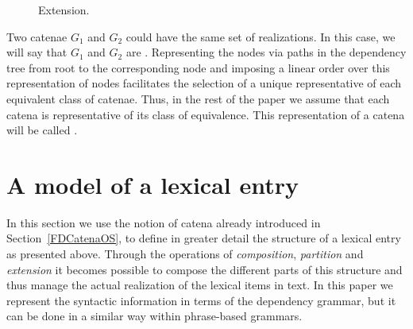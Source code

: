 \documentclass[output=paper,colorlinks,citecolor=brown]{langscibook}
\begin{document}
\begin{figure}[p]

  
  \caption{Extension.}
  \label{fig:Extension}
\end{figure}
\clearpage


Two catenae  $G_1$ and $G_2$ could have the same set of realizations. In this case, we will say that $G_1$ and $G_2$ are . Representing the nodes via paths in the dependency tree from root to the corresponding node and imposing a linear order over this representation of nodes facilitates the selection of a unique representative of each equivalent class of catenae. Thus, in the rest of the paper we assume that each catena is representative of its class of equivalence. This representation of a catena will be called .



\section{A model of a lexical entry}
\label{ModelLexEnOS}


In this section we use the notion of catena already introduced in Section~\ref{FDCatenaOS}, to define in greater detail the structure of a lexical entry as presented above. Through the operations of \textit{composition}, \textit{partition} and \textit{extension} it becomes possible to compose the different parts of this structure and thus manage the actual realization of the lexical items in text. In this paper we represent the syntactic information in terms of the dependency grammar, but it can be done in a similar way within phrase-based grammars.
\end{document}
